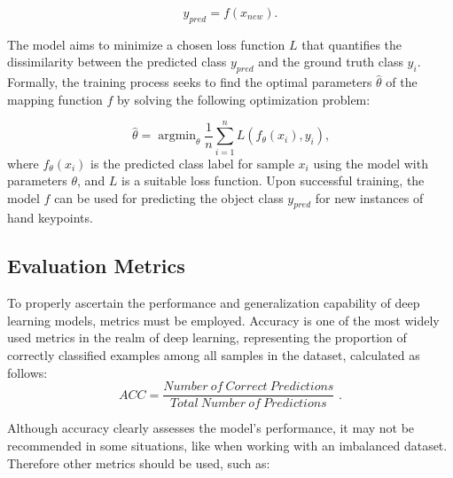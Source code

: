 \begin{equation}
y_{pred} = f(x_{new})\text{.}
\end{equation}

The model aims to minimize a chosen loss function $L$ that quantifies the dissimilarity between the predicted class $y_{pred}$ and the ground truth class $y_i$. Formally, the training process seeks to find the optimal parameters $\hat{\theta}$ of the mapping function $f$ by solving the following optimization problem:

\begin{equation}\label{eq:optimaltheta}
\hat{\theta} = \mathop{\mathrm{argmin}}_{\theta}\frac{1}{n} \sum_{i=1}^{n} L\left(f_{\theta}(x_i),y_i\right)\text{,}
\end{equation}
%
where $f_{\theta}(x_i)$ is the predicted class label for sample $x_i$ using the model with parameters $\theta$, and $L$ is a suitable loss function. Upon successful training, the model $f$ can be used for predicting the object class $y_{pred}$ for new instances of hand keypoints.

\subsection{Evaluation Metrics}

To properly ascertain the performance and generalization capability of deep learning models, metrics must be employed. Accuracy is one of the most widely used metrics in the realm of deep learning, representing the proportion of correctly classified examples among all samples in the dataset, calculated as follows: \begin{equation}ACC=\frac{Number\ of\ Correct\ Predictions}{Total\ Number\ of\ Predictions}\text{ .}\label{eq:acc}\end{equation}

Although accuracy clearly assesses the model's performance, it may not be recommended in some situations, like when working with an imbalanced dataset. Therefore other metrics should be used, such as:

